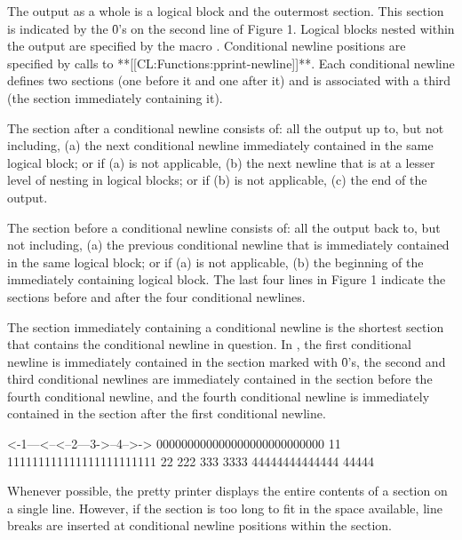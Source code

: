 The output as a whole is a logical block and the outermost section.  This
section is indicated by the \f{0}'s on the second line of Figure 1.  Logical
blocks nested within the output are specified by the macro
.  Conditional newline positions are specified 
by calls to **[[CL:Functions:pprint-newline]]**.  Each conditional newline defines 
two sections (one before it and one after it) and is associated with a 
third (the section immediately containing it).
 
The section after a conditional newline consists of: all the output up to,
but not including, (a) the next conditional newline immediately contained
in the same logical block; or if (a) is not applicable, (b) the next
newline that is at a lesser level of nesting in logical blocks; or if (b)
is not applicable, (c) the end of the output.
 
The section before a conditional newline consists of: all the output back
to, but not including, (a) the previous conditional newline that is
immediately contained in the same logical block; or if (a) is not
applicable, (b) the beginning of the immediately containing logical block.
The last four lines in Figure 1 indicate the sections before and after the
four conditional newlines.
 
The section immediately containing a conditional newline is the shortest
section that contains the conditional newline in question.  In \thenextfigure,
the first conditional newline is immediately contained in the section
marked with \f{0}'s, the second and third conditional newlines are immediately
contained in the section before the fourth conditional newline, and the
fourth conditional newline is immediately contained in the section after
the first conditional newline.
 
\code
 <-1---<--<--2---3->--4-->->
 000000000000000000000000000
 11 111111111111111111111111
           22 222
              333 3333
        44444444444444 44444
\endcode
{}
 
Whenever possible, the pretty printer displays the entire contents of a
section on a single line.  However, if the section is too long to fit in
the space available, line breaks are inserted at conditional newline
positions within the section.

\endsubsubsection%


